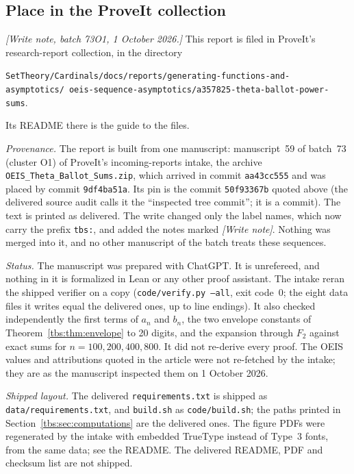 \documentclass[11pt,a4paper]{article}
\numberwithin{equation}{section}
\theoremstyle{definition}
\newcommand{\code}[1]{\texttt{#1}}
\begin{document}
\subsection{Place in the ProveIt collection}\label{tbs:sec:collection}
\emph{[Write note, batch 73O1, 1 October 2026.]} This report is filed in
ProveIt's research-report collection, in the directory
\begin{center}\small
\nolinkurl{SetTheory/Cardinals/docs/reports/generating-functions-and-asymptotics/}\
\nolinkurl{oeis-sequence-asymptotics/a357825-theta-ballot-power-sums}.
\end{center}
Its README there is the guide to the files.

\emph{Provenance.} The report is built from one manuscript: manuscript~59
of batch~73 (cluster O1) of ProveIt's incoming-reports intake, the archive
\code{OEIS\_Theta\_Ballot\_Sums.zip}, which arrived in commit
\code{aa43cc555} and was placed by commit \code{9df4ba51a}. Its pin is the
commit \code{50f93367b} quoted above (the delivered source audit calls it
the ``inspected tree commit''; it is a commit). The text is printed as
delivered. The write changed only the label names, which now carry the
prefix \code{tbs:}, and added the notes marked \emph{[Write note]}. Nothing
was merged into it, and no other manuscript of the batch treats these
sequences.

\emph{Status.} The manuscript was prepared with ChatGPT. It is unrefereed,
and nothing in it is formalized in Lean or any other proof assistant. The
intake reran the shipped verifier on a copy (\code{code/verify.py --all},
exit code~0; the eight data files it writes equal the delivered ones,
up to line endings). It also
checked independently the first terms of $a_n$ and $b_n$, the two envelope
constants of Theorem~\ref{tbs:thm:envelope} to 20 digits, and the
expansion through $F_2$ against exact sums for $n=100,200,400,800$. It did
not re-derive every proof. The OEIS values and attributions quoted in the
article were not re-fetched by the intake; they are as the manuscript
inspected them on 1 October 2026.

\emph{Shipped layout.} The delivered \code{requirements.txt} is shipped as
\code{data/requirements.txt}, and \code{build.sh} as \code{code/build.sh};
the paths printed in Section~\ref{tbs:sec:computations} are the delivered
ones. The figure PDFs were regenerated by the intake with embedded
TrueType instead of Type~3 fonts, from the same data; see the README. The
delivered README, PDF and checksum list are not shipped.
\end{document}
